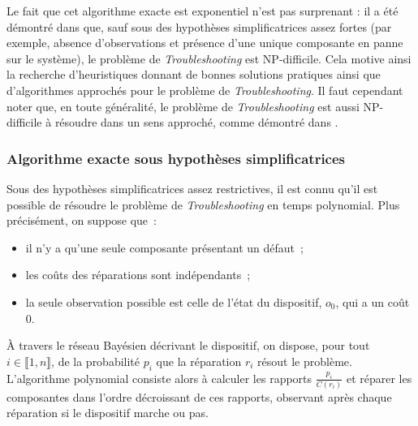 \documentclass[a4paper,11pt]{article}
\theoremstyle{plain}
\begin{document}
Le fait que cet algorithme exacte est exponentiel n'est pas surprenant : il a été démontré dans \cite{Vomlelov__2003} que, sauf sous des hypothèses simplificatrices assez fortes (par exemple, absence d'observations et présence d'une unique composante en panne sur le système), le problème de \emph{Troubleshooting} est NP-difficile. Cela motive ainsi la recherche d'heuristiques donnant de bonnes solutions pratiques ainsi que d'algorithmes approchés pour le problème de \emph{Troubleshooting}. Il faut cependant noter que, en toute généralité, le problème de \emph{Troubleshooting} est aussi NP-difficile à résoudre dans un sens approché, comme démontré dans \cite{L_n_2014}.

\subsubsection{Algorithme exacte sous hypothèses simplificatrices}

Sous des hypothèses simplificatrices assez restrictives, il est connu \cite{heckerman1994troubleshooting, Heckerman_1995, Vomlelov__2003, L_n_2014} qu'il est possible de résoudre le problème de \emph{Troubleshooting} en temps polynomial. Plus précisément, on suppose que~:
\begin{itemize}
\item il n'y a qu'une seule composante présentant un défaut~;
\item les coûts des réparations sont indépendants~; 
\item la seule observation possible est celle de l'état du dispositif, $o_0$, qui a un coût $0$.
\end{itemize}
À travers le réseau Bayésien décrivant le dispositif, on dispose, pour tout $i \in \llbracket 1, n\rrbracket$, de la probabilité $p_i$ que la réparation $r_i$ résout le problème. L'algorithme polynomial consiste alors à calculer les rapports $\frac{p_i}{C(r_i)}$ et réparer les composantes dans l'ordre décroissant de ces rapports, observant après chaque réparation si le dispositif marche ou pas.

\end{document}
